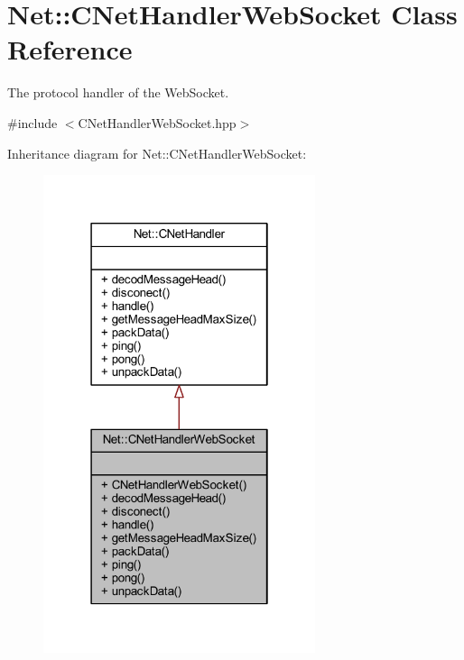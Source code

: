 \hypertarget{class_net_1_1_c_net_handler_web_socket}{}\section{Net\+:\+:C\+Net\+Handler\+Web\+Socket Class Reference}
\label{class_net_1_1_c_net_handler_web_socket}


The protocol handler of the Web\+Socket.  




{\ttfamily \#include $<$C\+Net\+Handler\+Web\+Socket.\+hpp$>$}



Inheritance diagram for Net\+:\+:C\+Net\+Handler\+Web\+Socket\+:
\nopagebreak
\begin{figure}[H]
\begin{center}
\leavevmode
\includegraphics[width=226pt]{class_net_1_1_c_net_handler_web_socket__inherit__graph}
\end{center}
\end{figure}


